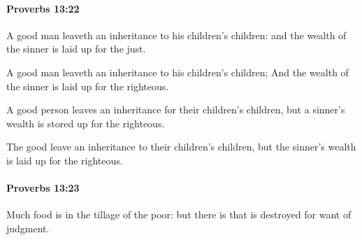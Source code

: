 		\paragraph{Proverbs 13:22} %
			\label{PROVERBS-13-22}

			A good man leaveth an inheritance to his children’s children: and the wealth of the sinner is laid up for the just.

			\begin{versebox}
					\item[BHS] 
					\item[ASV] A good man leaveth an inheritance to his children's children; And the wealth of the sinner is laid up for the righteous.
					\item[NIV] A good person leaves an inheritance for their children’s children, but a sinner’s wealth is stored up for the righteous.
					\item[NRSV] The good leave an inheritance to their children’s children, but the sinner’s wealth is laid up for the righteous.
			\end{versebox}

		\paragraph{Proverbs 13:23} %
			\label{PROVERBS-13-23}

			Much food is in the tillage of the poor: but there is that is destroyed for want of judgment.

